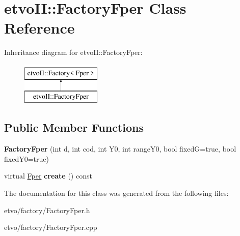 \hypertarget{classetvo_i_i_1_1_factory_fper}{}\section{etvo\+II\+:\+:Factory\+Fper Class Reference}
\label{classetvo_i_i_1_1_factory_fper}
Inheritance diagram for etvo\+II\+:\+:Factory\+Fper\+:\begin{figure}[H]
\begin{center}
\leavevmode
\includegraphics[height=2.000000cm]{classetvo_i_i_1_1_factory_fper}
\end{center}
\end{figure}
\subsection*{Public Member Functions}
\begin{DoxyCompactItemize}
\item 
\mbox{\label{classetvo_i_i_1_1_factory_fper_ac61ad54d72b59e5cd1c3056e8240aa6f}} 
{\bfseries Factory\+Fper} (int d, int cod, int Y0, int range\+Y0, bool fixedG=true, bool fixed\+Y0=true)
\item 
\mbox{\label{classetvo_i_i_1_1_factory_fper_a00419c2dc7090c04353dedc0a291adc0}} 
virtual \mbox{\hyperlink{classetvo_i_i_1_1_fper}{Fper}} {\bfseries create} () const
\end{DoxyCompactItemize}


The documentation for this class was generated from the following files\+:\begin{DoxyCompactItemize}
\item 
etvo/factory/Factory\+Fper.\+h\item 
etvo/factory/Factory\+Fper.\+cpp\end{DoxyCompactItemize}
